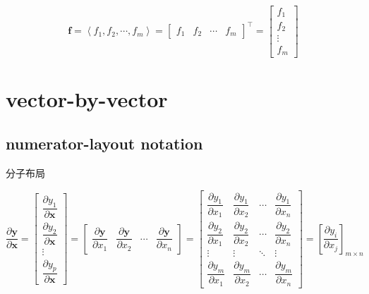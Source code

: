 \documentclass[
]{book}
\theoremstyle{definition}
\theoremstyle{definition}
\theoremstyle{definition}
\theoremstyle{definition}
\theoremstyle{remark}
\begin{document}
\[
\boldsymbol{f}=\left\langle f_{1},f_{2},\cdots,f_{m}\right\rangle =\begin{bmatrix}f_{1} & f_{2} & \cdots & f_{m}\end{bmatrix}^{\intercal}=\begin{bmatrix}f_{1}\\
f_{2}\\
\vdots\\
f_{m}
\end{bmatrix}
\]

\section{vector-by-vector}\label{vector-by-vector}

\subsection{numerator-layout notation}\label{numerator-layout-notation}

\begin{CJK}{UTF8}{bsmi}
分子布局
\end{CJK}

\[
\dfrac{\partial\boldsymbol{y}}{\partial\boldsymbol{x}}=\begin{bmatrix}\dfrac{\partial y_{1}}{\partial\boldsymbol{x}}\\
\dfrac{\partial y_{2}}{\partial\boldsymbol{x}}\\
\vdots\\
\dfrac{\partial y_{p}}{\partial\boldsymbol{x}}
\end{bmatrix}=\begin{bmatrix}\dfrac{\partial\boldsymbol{y}}{\partial x_{1}} & \dfrac{\partial\boldsymbol{y}}{\partial x_{2}} & \cdots & \dfrac{\partial\boldsymbol{y}}{\partial x_{n}}\end{bmatrix}=\begin{bmatrix}\dfrac{\partial y_{1}}{\partial x_{1}} & \dfrac{\partial y_{1}}{\partial x_{2}} & \cdots & \dfrac{\partial y_{1}}{\partial x_{n}}\\
\dfrac{\partial y_{2}}{\partial x_{1}} & \dfrac{\partial y_{2}}{\partial x_{2}} & \cdots & \dfrac{\partial y_{2}}{\partial x_{n}}\\
\vdots & \vdots & \ddots & \vdots\\
\dfrac{\partial y_{m}}{\partial x_{1}} & \dfrac{\partial y_{m}}{\partial x_{2}} & \cdots & \dfrac{\partial y_{m}}{\partial x_{n}}
\end{bmatrix}=\left[\dfrac{\partial y_{i}}{\partial x_{j}}\right]_{m\times n}
\]
\end{document}
